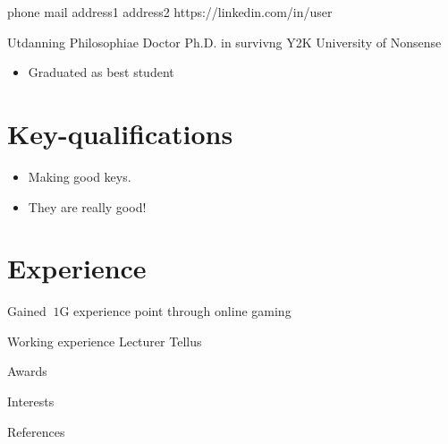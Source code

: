 \documentclass{nicecv}
\begin{document}
\begin{topinfo}%
           {phone}
           {mail}
           {address1}
           {address2}
            {https://linkedin.com/in/user}
\end{topinfo}

\begin{minipage}{0.5\textwidth}
    \begin{education}{Utdanning}
              {Philosophiae Doctor}
              {Ph.D. in survivng Y2K}
              {University of Nonsense}
              {
                \begin{itemize}[noitemsep,nolistsep,leftmargin=0in]
                    \item Graduated as best student
                \end{itemize}
              }
    \end{education}
\end{minipage}
\hfill
\begin{minipage}{0.425\textwidth}

    \section{Key-qualifications}
    \begin{itemize}[noitemsep,nolistsep]
        \item Making good keys.
        \item They are really good!
    \end{itemize}

    \vfill

    \section{Experience}
    Gained $~1$G experience point through online gaming

    \vfill

    \begin{work}{Working experience}
              {Lecturer}
              {Tellus}
    \end{work}

    \begin{awards}{Awards}
    \end{awards}
\end{minipage}


\vspace{0.2in}

\begin{others}{Interests}
\end{others}

\begin{references}{References}
\end{references}
\end{document}

